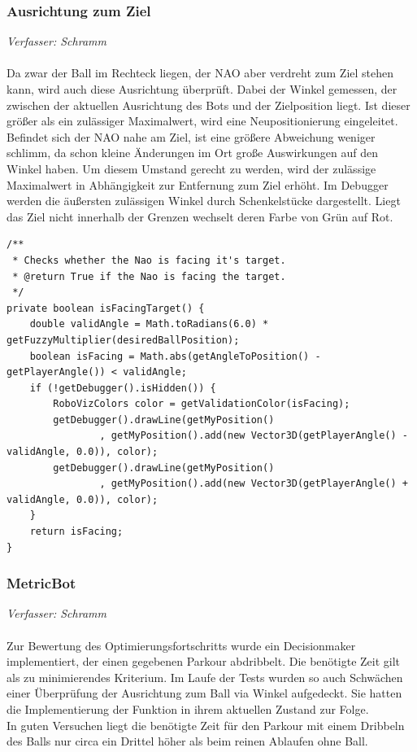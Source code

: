 \subsubsection{Ausrichtung zum Ziel}
\textit{Verfasser: Schramm}\\
\\
Da zwar der Ball im Rechteck liegen, der NAO aber verdreht zum Ziel stehen kann, wird auch diese Ausrichtung überprüft. Dabei der Winkel gemessen, der zwischen der aktuellen Ausrichtung des Bots und der Zielposition liegt. Ist dieser größer als ein zulässiger Maximalwert, wird eine Neupositionierung eingeleitet.\\
Befindet sich der NAO nahe am Ziel, ist eine größere Abweichung weniger schlimm, da schon kleine Änderungen im Ort große Auswirkungen auf den Winkel haben. Um diesem Umstand gerecht zu werden, wird der zulässige Maximalwert in Abhängigkeit zur Entfernung zum Ziel erhöht. Im Debugger werden die äußersten zulässigen Winkel durch Schenkelstücke dargestellt. Liegt das Ziel nicht innerhalb der Grenzen wechselt deren Farbe von Grün auf Rot.


\begin{lstlisting}[caption=Ausrichtung zum Ziel, captionpos=b, label=lst:facing-target]
/**
 * Checks whether the Nao is facing it's target.
 * @return True if the Nao is facing the target.
 */
private boolean isFacingTarget() {
    double validAngle = Math.toRadians(6.0) * getFuzzyMultiplier(desiredBallPosition);
    boolean isFacing = Math.abs(getAngleToPosition() - getPlayerAngle()) < validAngle;
    if (!getDebugger().isHidden()) {
        RoboVizColors color = getValidationColor(isFacing);
        getDebugger().drawLine(getMyPosition()
                , getMyPosition().add(new Vector3D(getPlayerAngle() - validAngle, 0.0)), color);
        getDebugger().drawLine(getMyPosition()
                , getMyPosition().add(new Vector3D(getPlayerAngle() + validAngle, 0.0)), color);
    }
    return isFacing;
}
\end{lstlisting}

\subsubsection{MetricBot}
\textit{Verfasser: Schramm}\\
\\
Zur Bewertung des Optimierungsfortschritts wurde ein Decisionmaker implementiert, der einen gegebenen Parkour abdribbelt. Die benötigte Zeit gilt als zu minimierendes Kriterium. Im Laufe der Tests wurden so auch Schwächen einer Überprüfung der Ausrichtung zum Ball via Winkel aufgedeckt. Sie hatten die Implementierung der Funktion in ihrem aktuellen Zustand zur Folge.\\
In guten Versuchen liegt die benötigte Zeit für den Parkour mit einem Dribbeln des Balls nur circa ein Drittel höher als beim reinen Ablaufen ohne Ball.

